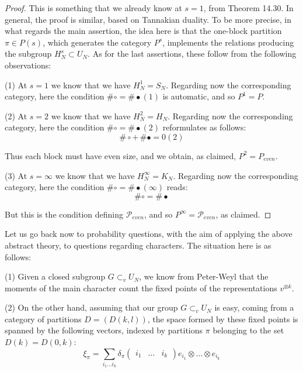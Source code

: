 \documentclass[12pt]{amsbook}
\begin{document}
\begin{proof}
This is something that we already know at $s=1$, from Theorem 14.30. In general, the proof is similar, based on Tannakian duality. To be more precise, in what regards the main assertion, the idea here is that the one-block partition $\pi\in P(s)$, which generates the category $P^s$, implements the relations producing the subgroup $H_N^s\subset U_N$. As for the last assertions, these follow from the following observations:

\medskip

(1) At $s=1$ we know that we have $H_N^1=S_N$. Regarding now the corresponding category, here the condition $\#\circ=\#\bullet(1)$ is automatic, and so $P^1=P$.

\medskip

(2) At $s=2$ we know that we have $H_N^2=H_N$. Regarding now the corresponding category, here the condition $\#\circ=\#\bullet(2)$ reformulates as follows:
$$\#\circ+\,\#\bullet=0(2)$$

Thus each block must have even size, and we obtain, as claimed, $P^2=P_{even}$.

\medskip

(3) At $s=\infty$ we know that we have $H_N^\infty=K_N$. Regarding now the corresponding category, here the condition $\#\circ=\#\bullet(\infty)$ reads:
$$\#\circ=\#\bullet$$

But this is the condition defining $\mathcal P_{even}$, and so $P^\infty=\mathcal P_{even}$, as claimed.
\end{proof}

Let us go back now to probability questions, with the aim of applying the above abstract theory, to questions regarding characters. The situation here is as follows:

\bigskip

(1) Given a closed subgroup $G\subset_vU_N$, we know from Peter-Weyl that the moments of the main character count the fixed points of the representations $v^{\otimes k}$. 

\bigskip

(2) On the other hand, assuming that our group $G\subset_vU_N$ is easy, coming from a category of partitions $D=(D(k,l))$, the space formed by these fixed points is spanned by the following vectors, indexed by partitions $\pi$ belonging to the set $D(k)=D(0,k)$:
$$\xi_\pi=\sum_{i_1\ldots i_k}\delta_\pi\begin{pmatrix}i_1&\ldots&i_k\end{pmatrix}e_{i_1}\otimes\ldots\otimes e_{i_k}$$
\end{document}
